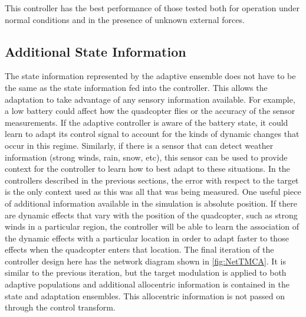 \documentclass[letterpaper,12pt,titlepage,oneside,final]{book}
\begin{document}
This controller has the best performance of those tested both for operation under normal conditions and in the presence of unknown external forces.

\subsection{Additional State Information}

The state information represented by the adaptive ensemble does not have to be the same as the state information fed into the controller.
This allows the adaptation to take advantage of any sensory information available.
For example, a low battery could affect how the quadcopter flies or the accuracy of the sensor measurements. If the adaptive controller is aware of the battery state, it could learn to adapt its control signal to account for the kinds of dynamic changes that occur in this regime.
Similarly, if there is a sensor that can detect weather information (strong winds, rain, snow, etc), this sensor can be used to provide context for the controller to learn how to best adapt to these situations.
In the controllers described in the previous sections, the error with respect to the target is the only context used as this was all that was being measured.
One useful piece of additional information available in the simulation is absolute position.
If there are dynamic effects that vary with the position of the quadcopter, such as strong winds in a particular region, the controller will be able to learn the association of the dynamic effects with a particular location in order to adapt faster to those effects when the quadcopter enters that location.
The final iteration of the controller design here has the network diagram shown in \autoref{fig:NetTMCA}.
It is similar to the previous iteration, but the target modulation is applied to both adaptive populations and additional allocentric information is contained in the state and adaptation ensembles. 
This allocentric information is not passed on through the control transform.

\end{document}
